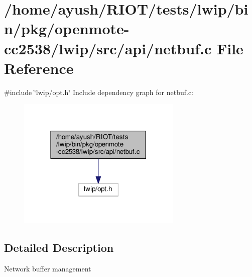 \hypertarget{openmote-cc2538_2lwip_2src_2api_2netbuf_8c}{}\section{/home/ayush/\+R\+I\+O\+T/tests/lwip/bin/pkg/openmote-\/cc2538/lwip/src/api/netbuf.c File Reference}
\label{openmote-cc2538_2lwip_2src_2api_2netbuf_8c}
{\ttfamily \#include \char`\"{}lwip/opt.\+h\char`\"{}}\newline
Include dependency graph for netbuf.\+c\+:
\nopagebreak
\begin{figure}[H]
\begin{center}
\leavevmode
\includegraphics[width=222pt]{openmote-cc2538_2lwip_2src_2api_2netbuf_8c__incl}
\end{center}
\end{figure}


\subsection{Detailed Description}
Network buffer management 